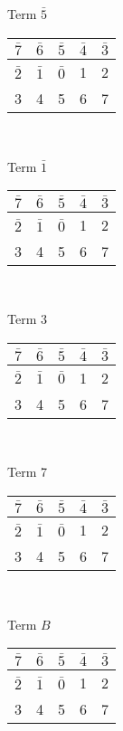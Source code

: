 \documentclass[12 pt]{article}%
\begin{document}
\begin{multicols}{4}
\begin{center}
    Term $\bar 5$ \\
    \begin{tabular}{|c|c|c|c|c|}
      \hline
      $ \bar 7 $ & $ \bar 6 $ & $ \bar 5 $ & $\bar 4$ & $\bar 3 $ \\
      \hline
      $ \bar 2 $ & $ \bar 1 $ & $ \bar 0 $ & 1 & 2\\
      \hline
      3 & 4 & 5 & 6 & 7 \\
      \hline
    \end{tabular}\\
    \bigskip

    Term $\bar 1$ \\
    \begin{tabular}{|c|c|c|c|c|}
      \hline
      $ \bar 7 $ & $ \bar 6 $ & $ \bar 5 $ & $\bar 4$ & $\bar 3 $ \\
      \hline
      $ \bar 2 $ & $ \bar 1 $ & $ \bar 0 $ & 1 & 2\\
      \hline
      3 & 4 & 5 & 6 & 7 \\
      \hline
    \end{tabular}\\
    \bigskip

    Term 3 \\
    \begin{tabular}{|c|c|c|c|c|}
      \hline
      $ \bar 7 $ & $ \bar 6 $ & $ \bar 5 $ & $\bar 4$ & $\bar 3 $ \\
      \hline
      $ \bar 2 $ & $ \bar 1 $ & $ \bar 0 $ & 1 & 2\\
      \hline
      3 & 4 & 5 & 6 & 7 \\
      \hline
    \end{tabular}\\
    \bigskip

    Term 7 \\
    \begin{tabular}{|c|c|c|c|c|}
      \hline
      $ \bar 7 $ & $ \bar 6 $ & $ \bar 5 $ & $\bar 4$ & $\bar 3 $ \\
      \hline
      $ \bar 2 $ & $ \bar 1 $ & $ \bar 0 $ & 1 & 2\\
      \hline
      3 & 4 & 5 & 6 & 7 \\
      \hline
    \end{tabular}\\
    \bigskip

    Term $B$ \\
    \begin{tabular}{|c|c|c|c|c|}
      \hline
      $ \bar 7 $ & $ \bar 6 $ & $ \bar 5 $ & $\bar 4$ & $\bar 3 $ \\
      \hline
      $ \bar 2 $ & $ \bar 1 $ & $ \bar 0 $ & 1 & 2\\
      \hline
      3 & 4 & 5 & 6 & 7 \\
      \hline
    \end{tabular}\\

  \end{center}

\end{multicols}
\end{document}
